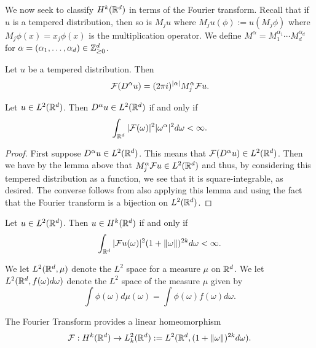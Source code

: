 \documentclass[twoside, a4paper, 10pt]{amsart}
\begin{document}
We now seek to classify $H^k(\mathbb{R}^d)$ in terms of the Fourier transform. Recall that if $u$ is a tempered distribution, then so is $M_j u$ where $M_j u (\phi) := u(M_j \phi)$ where $M_j \phi (x) = x_j \phi(x)$ is the multiplication operator. We define $M^{\alpha} = M_1^{\alpha_1} \cdots M_d^{\alpha_d}$ for $\alpha = (\alpha_1, \ldots, \alpha_d) \in \mathbb{Z}_{\geq 0}^d$.

\begin{lemma} Let $u$ be a tempered distribution. Then $$\mathcal{F}(D^{\alpha}u) = (2\pi i )^{|\alpha|} M_j^{\alpha} \mathcal{F} u.$$

\end{lemma}

\begin{corol} Let $u \in L^2(\mathbb{R}^d)$. Then $D^{\alpha}u \in L^2(\mathbb{R}^d)$ if and only if $$\int_{\mathbb{R}^d} |\mathcal{F} (\omega)|^2 |\omega^{\alpha}|^2 d\omega < \infty.$$

\end{corol}

\begin{proof} First suppose $D^{\alpha}u \in L^2(\mathbb{R}^d)$. This means that $\mathcal{F}(D^{\alpha}u) \in L^2(\mathbb{R}^d)$. Then we have by the lemma above that $M_j^{\alpha} \mathcal{F} u \in L^2(\mathbb{R}^d)$ and thus, by considering this tempered distribution as a function, we see that it is square-integrable, as desired. The converse follows from also applying this lemma and using the fact that the Fourier transform is a bijection on $L^2(\mathbb{R}^d)$. \end{proof}

\begin{corol} Let $u \in L^2(\mathbb{R}^d)$. Then $u \in H^k(\mathbb{R}^d)$ if and only if $$\int_{\mathbb{R}^d} |\mathcal{F} u(\omega)|^2 (1+\|\omega\|)^{2k} d\omega < \infty.$$ 

\end{corol}

We let $L^2(\mathbb{R}^d, \mu)$ denote the $L^2$ space for a measure $\mu$ on $\mathbb{R}^d$. We let $L^2(\mathbb{R}^d, f(\omega)d\omega)$ denote the $L^2$ space of the measure $\mu$ given by $$\int \phi(\omega) d\mu(\omega) = \int  \phi(\omega) f(\omega) d\omega.$$

\begin{prop} The Fourier Transform provides a linear homeomorphism $$\mathcal{F}: H^k(\mathbb{R}^d) \to L^2_k(\mathbb{R}^d) := L^2(\mathbb{R}^d, (1+\|\omega\|)^{2k} d\omega).$$

\end{prop}
\end{document}
